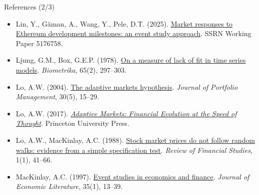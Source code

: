 \begin{frame}{References (2/3)}
\begin{itemize}
    \item Lin, Y., Găman, A., Wang, Y., Pele, D.T. (2025). \href{https://doi.org/10.2139/ssrn.5176758}{Market responses to Ethereum development milestones: an event study approach}. SSRN Working Paper 5176758.
    \item Ljung, G.M., Box, G.E.P. (1978). \href{https://doi.org/10.1093/biomet/65.2.297}{On a measure of lack of fit in time series models}. \textit{Biometrika}, 65(2), 297--303.
    \item Lo, A.W. (2004). \href{https://doi.org/10.3905/jpm.2004.442611}{The adaptive markets hypothesis}. \textit{Journal of Portfolio Management}, 30(5), 15--29.
    \item Lo, A.W. (2017). \href{https://doi.org/10.1515/9781400887767}{\textit{Adaptive Markets: Financial Evolution at the Speed of Thought}}. Princeton University Press.
    \item Lo, A.W., MacKinlay, A.C. (1988). \href{https://doi.org/10.1093/rfs/1.1.41}{Stock market prices do not follow random walks: evidence from a simple specification test}. \textit{Review of Financial Studies}, 1(1), 41--66.
    \item MacKinlay, A.C. (1997). \href{https://ideas.repec.org/a/aea/jeclit/v35y1997i1p13-39.html}{Event studies in economics and finance}. \textit{Journal of Economic Literature}, 35(1), 13--39.
\end{itemize}
\end{frame}

